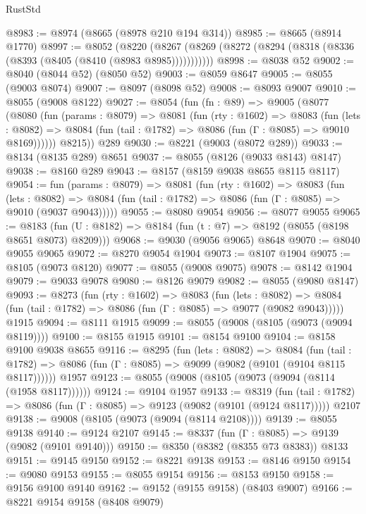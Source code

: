 \begin{lexlean}{RustStd}
\begin{coremodule}
{\begin{coremodule}
{{{{{{{{{{{{{{{{{{{{{{{{{{{{{{{{{{{{{{{{{{{{{{{@8983 := @8974 (@8665 (@8978 @210 @194 @314))
@8985 := @8665 (@8914 @1770)
@8997 := @8052
    (@8220 (@8267 (@8269 (@8272 (@8294 (@8318 (@8336 (@8393 (@8405 (@8410 (@8983 @8985)))))))))))
@8998 := @8038 @52
@9002 := @8040 (@8044 @52) (@8050 @52)
@9003 := @8059 @8647
@9005 := @8055 (@9003 @8074)
@9007 := @8097 (@8098 @52)
@9008 := @8093 @9007
@9010 := @8055 (@9008 @8122)
@9027 := @8054
    (fun (fn : @89) =>
    @9005
      (@8077
        (@8080
          (fun (params : @8079) =>
          @8081
            (fun (rty : @1602) =>
            @8083
              (fun (lets : @8082) =>
              @8084 (fun (tail : @1782) => @8086 (fun (Γ : @8085) => @9010 @8169))))))
        @8215))
    @289
@9030 := @8221 (@9003 (@8072 @289))
@9033 := @8134 (@8135 @289) @8651
@9037 := @8055 (@8126 (@9033 @8143) @8147)
@9038 := @8160 @289
@9043 := @8157 (@8159 @9038 @8655 @8115 @8117)
@9054 := fun (params : @8079) =>
  @8081
    (fun (rty : @1602) =>
    @8083
      (fun (lets : @8082) =>
      @8084 (fun (tail : @1782) => @8086 (fun (Γ : @8085) => @9010 (@9037 @9043)))))
@9055 := @8080 @9054
@9056 := @8077 @9055
@9065 := @8183 (fun (U : @8182) => @8184 (fun (t : @7) => @8192 (@8055 (@8198 @8651 @8073) @8209)))
@9068 := @9030 (@9056 @9065) @8648
@9070 := @8040 @9055 @9065
@9072 := @8270 @9054 @1904
@9073 := @8107 @1904
@9075 := @8105 (@9073 @8120)
@9077 := @8055 (@9008 @9075)
@9078 := @8142 @1904
@9079 := @9033 @9078
@9080 := @8126 @9079
@9082 := @8055 (@9080 @8147)
@9093 := @8273
    (fun (rty : @1602) =>
    @8083
      (fun (lets : @8082) =>
      @8084 (fun (tail : @1782) => @8086 (fun (Γ : @8085) => @9077 (@9082 @9043)))))
    @1915
@9094 := @8111 @1915
@9099 := @8055 (@9008 (@8105 (@9073 (@9094 @8119))))
@9100 := @8155 @1915
@9101 := @8154 @9100
@9104 := @8158 @9100 @9038 @8655
@9116 := @8295
    (fun (lets : @8082) =>
    @8084
      (fun (tail : @1782) => @8086 (fun (Γ : @8085) => @9099 (@9082 (@9101 (@9104 @8115 @8117))))))
    @1957
@9123 := @8055 (@9008 (@8105 (@9073 (@9094 (@8114 (@1958 @8117))))))
@9124 := @9104 @1957
@9133 := @8319
    (fun (tail : @1782) => @8086 (fun (Γ : @8085) => @9123 (@9082 (@9101 (@9124 @8117)))))
    @2107
@9138 := @9008 (@8105 (@9073 (@9094 (@8114 @2108))))
@9139 := @8055 @9138
@9140 := @9124 @2107
@9145 := @8337 (fun (Γ : @8085) => @9139 (@9082 (@9101 @9140)))
@9150 := @8350 (@8382 (@8355 @73 @8383)) @8133
@9151 := @9145 @9150
@9152 := @8221 @9138
@9153 := @8146 @9150
@9154 := @9080 @9153
@9155 := @8055 @9154
@9156 := @8153 @9150
@9158 := @9156 @9100 @9140
@9162 := @9152 (@9155 @9158) (@8403 @9007)
@9166 := @8221 @9154 @9158 (@8408 @9079)
}}}}}}}}}}}}}}}}}}}}}}}}}}}}}}}}}}}}}}}}}}}}}}}
\end{coremodule}}
\end{coremodule}
\end{lexlean}

